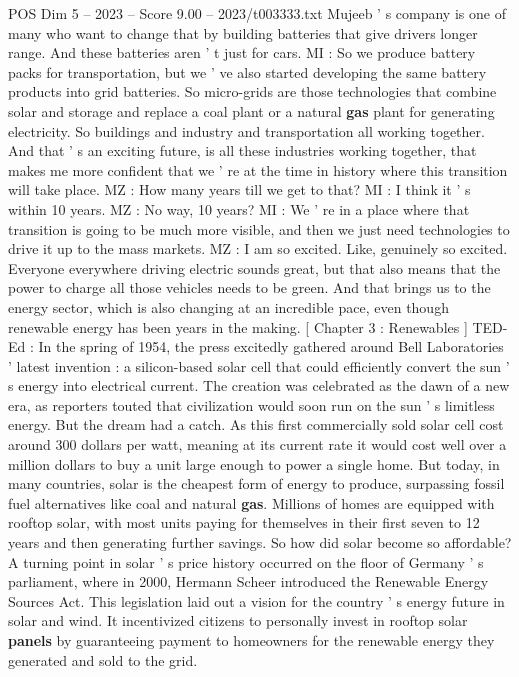 \begin{textsample}{POS Dim 5 – 2023 – Score 9.00 – 2023/t003333.txt}
Mujeeb ' s company is one of many who want to change that by building batteries that give drivers longer range.
And these batteries aren ' t just for cars.
MI : So we produce battery packs for transportation, but we ' ve also started developing the same battery products into grid batteries.
So micro-grids are those technologies that combine solar and storage and replace a coal plant or a natural \textbf{gas} plant for generating electricity.
So buildings and industry and transportation all working together.
And that ' s an exciting future, is all these industries working together, that makes me more confident that we ' re at the time in history where this transition will take place.
MZ : How many years till we get to that?
MI : I think it ' s within 10 years.
MZ : No way, 10 years?
MI : We ' re in a place where that transition is going to be much more visible, and then we just need technologies to drive it up to the mass markets.
MZ : I am so excited.
Like, genuinely so excited.
Everyone everywhere driving electric sounds great, but that also means that the power to charge all those vehicles needs to be green.
And that brings us to the energy sector, which is also changing at an incredible pace, even though renewable energy has been years in the making. [ Chapter 3 : Renewables ] TED-Ed : In the spring of 1954, the press excitedly gathered around Bell Laboratories ' latest invention : a silicon-based solar cell that could efficiently convert the sun ' s energy into electrical current.
The creation was celebrated as the dawn of a new era, as reporters touted that civilization would soon run on the sun ' s limitless energy.
But the dream had a catch.
As this first commercially sold solar cell cost around 300 dollars per watt, meaning at its current rate it would cost well over a million dollars to buy a unit large enough to power a single home.
But today, in many countries, solar is the cheapest form of energy to produce, surpassing fossil fuel alternatives like coal and natural \textbf{gas}.
Millions of homes are equipped with rooftop solar, with most units paying for themselves in their first seven to 12 years and then generating further savings.
So how did solar become so affordable?
A turning point in solar ' s price history occurred on the floor of Germany ' s parliament, where in 2000, Hermann Scheer introduced the Renewable Energy Sources Act.
This legislation laid out a vision for the country ' s energy future in solar and wind.
It incentivized citizens to personally invest in rooftop solar \textbf{panels} by guaranteeing payment to homeowners for the renewable energy they generated and sold to the grid.

\end{textsample}
